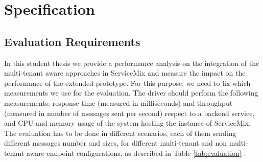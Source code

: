 \section{Specification}
\label{sec:evaluationspecification}



\subsection{Evaluation Requirements}
\label{sec:evalrequirements}


In this student thesis we provide a performance analysis on the integration of the multi-tenant aware approaches in ServiceMix and measure the impact on the performance of the extended prototype. For this purpose, we need to fix which measurements we use for the evaluation. The driver should perform the following measurements: response time (measured in milliseconds) and throughput (measured in number of messages sent per second) respect to a backend service, and CPU and memory usage of the system hosting the instance of ServiceMix. The evaluation has to be done in different scenarios, each of them sending different messages number and sizes, for different multi-tenant and non multi-tenant aware endpoint configurations, as described in Table \ref{tab:evaluation} \cite{EvalESB}.

